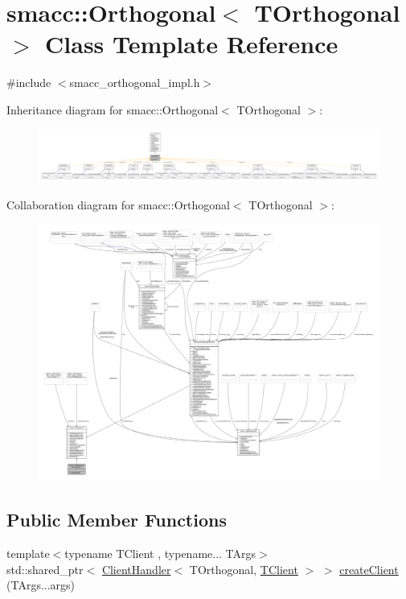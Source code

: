 \hypertarget{classsmacc_1_1Orthogonal}{}\section{smacc\+:\+:Orthogonal$<$ T\+Orthogonal $>$ Class Template Reference}
\label{classsmacc_1_1Orthogonal}


{\ttfamily \#include $<$smacc\+\_\+orthogonal\+\_\+impl.\+h$>$}



Inheritance diagram for smacc\+:\+:Orthogonal$<$ T\+Orthogonal $>$\+:
\nopagebreak
\begin{figure}[H]
\begin{center}
\leavevmode
\includegraphics[width=350pt]{classsmacc_1_1Orthogonal__inherit__graph}
\end{center}
\end{figure}


Collaboration diagram for smacc\+:\+:Orthogonal$<$ T\+Orthogonal $>$\+:
\nopagebreak
\begin{figure}[H]
\begin{center}
\leavevmode
\includegraphics[width=350pt]{classsmacc_1_1Orthogonal__coll__graph}
\end{center}
\end{figure}
\subsection*{Public Member Functions}
\begin{DoxyCompactItemize}
\item 
{\footnotesize template$<$typename T\+Client , typename... T\+Args$>$ }\\std\+::shared\+\_\+ptr$<$ \hyperlink{classsmacc_1_1ClientHandler}{Client\+Handler}$<$ T\+Orthogonal, \hyperlink{classTClient}{T\+Client} $>$ $>$ \hyperlink{classsmacc_1_1Orthogonal_af9e1b8d75e705c0f409d29acda08db5a}{create\+Client} (T\+Args...\+args)
\end{DoxyCompactItemize}
